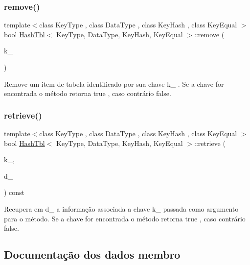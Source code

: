 \subsubsection{\texorpdfstring{remove()}{remove()}}
{\footnotesize\ttfamily template$<$class Key\+Type , class Data\+Type , class Key\+Hash , class Key\+Equal $>$ \\
bool \hyperlink{classHashTbl}{Hash\+Tbl}$<$ Key\+Type, Data\+Type, Key\+Hash, Key\+Equal $>$\+::remove (\begin{DoxyParamCaption}\item[{const Key\+Type \&}]{k\+\_\+ }\end{DoxyParamCaption})\hspace{0.3cm}{\ttfamily [inline]}}

Remove um item de tabela identificado por sua chave k\+\_\+ . Se a chave for encontrada o método retorna true , caso contrário false. \mbox{\label{classHashTbl_adbe3cac7c4109dd57627e1f87257202b}} 
\subsubsection{\texorpdfstring{retrieve()}{retrieve()}}
{\footnotesize\ttfamily template$<$class Key\+Type , class Data\+Type , class Key\+Hash , class Key\+Equal $>$ \\
bool \hyperlink{classHashTbl}{Hash\+Tbl}$<$ Key\+Type, Data\+Type, Key\+Hash, Key\+Equal $>$\+::retrieve (\begin{DoxyParamCaption}\item[{const Key\+Type \&}]{k\+\_\+,  }\item[{Data\+Type \&}]{d\+\_\+ }\end{DoxyParamCaption}) const\hspace{0.3cm}{\ttfamily [inline]}}

Recupera em d\+\_\+ a informação associada a chave k\+\_\+ passada como argumento para o método. Se a chave for encontrada o método retorna true , caso contrário false. 

\subsection{Documentação dos dados membro}
\mbox{\label{classHashTbl_aeffa5b1a163fb6a09a18fd254a4d6dcf}} 
